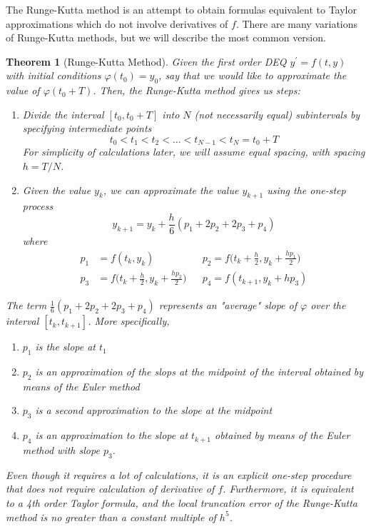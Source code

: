\documentclass{article}
\newtheorem{theorem}{Theorem}[section]
\theoremstyle{remark}
\theoremstyle{definition}
\begin{document}
    The Runge-Kutta method is an attempt to obtain formulas equivalent to Taylor approximations which do not involve derivatives of $f$. There are many variations of Runge-Kutta methods, but we will describe the most common version. 

    \begin{theorem}[Runge-Kutta Method]
    Given the first order DEQ $y^\prime = f(t, y)$ with initial conditions $\varphi(t_0) = y_0$, say that we would like to approximate the value of $\varphi(t_0 + T)$. Then, the \textit{Runge-Kutta method} gives us steps: 
    \begin{enumerate}
        \item Divide the interval $[t_0, t_0 + T]$ into $N$ (not necessarily equal) subintervals by specifying intermediate points 
        \[t_0 < t_1 < t_2 < \ldots < t_{N-1} < t_N = t_0 + T\]
        For simplicity of calculations later, we will assume equal spacing, with spacing $h = T/N$. 
        \item Given the value $y_k$, we can approximate the value $y_{k+1}$ using the one-step process
        \[y_{k+1} = y_k + \frac{h}{6} (p_1 + 2p_2 + 2p_3 + p_4)\]
        where 
        \begin{align*}
            p_1 & = f(t_k, y_k) & & p_2 = f\bigg( t_k + \frac{h}{2}, y_k + \frac{h p_1}{2}\bigg)  \\
            p_3 & = f\bigg( t_k + \frac{h}{2} , y_k + \frac{h p_2}{2} \bigg) & & p_4 = f(t_{k+1}, y_k + h p_3)
        \end{align*}
    \end{enumerate}
    The term $\frac{1}{6} (p_1 + 2p_2 + 2p_3 + p_4)$ represents an "average" slope of $\varphi$ over the interval $[t_k, t_{k+1}]$. More specifically, 
    \begin{enumerate}
        \item $p_1$ is the slope at $t_1$
        \item $p_2$ is an approximation of the slops at the midpoint of the interval obtained by means of the Euler method
        \item $p_3$ is a second approximation to the slope at the midpoint
        \item $p_4$ is an approximation to the slope at $t_{k+1}$ obtained by means of the Euler method with slope $p_3$. 
    \end{enumerate}
    Even though it requires a lot of calculations, it is an explicit one-step procedure that does not require calculation of derivative of $f$. Furthermore, it is equivalent to a 4th order Taylor formula, and the local truncation error of the Runge-Kutta method is no greater than a constant multiple of $h^5$. 
    \end{theorem}
\end{document}
